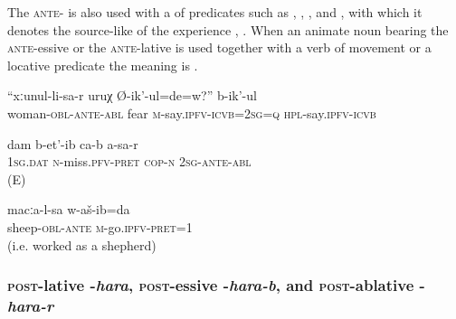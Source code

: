 The \textsc{ante}- is also used with a  of  predicates such as , , , and , with which it denotes the source-like  of the experience , . When an animate noun bearing the \textsc{ante}-essive or the \textsc{ante}-lative is used together with a verb of movement or a locative predicate the meaning is  .
%
\begin{exe}
	\ex	\label{They say, are you afraid of your wife}
	\gll	``xːunul-li-sa-r	uruχ	Ø-ik'-ul=de=w?''	b-ik'-ul \\
		woman-\textsc{obl}-\textsc{ante}-\textsc{abl} fear \textsc{m}-say.\textsc{ipfv}-\textsc{icvb}=2\textsc{sg}=\textsc{q} \textsc{hpl}-say.\textsc{ipfv}-\textsc{icvb}\\
	\glt	{}

	\ex	\label{ex:I miss youMorph}
	\gll	dam b-et'-ib ca-b a-sa-r \\
	\textsc{1sg.dat} \textsc{n}-miss.\textsc{pfv-pret} \textsc{cop-n} \textsc{2sg-ante-abl}	\\
	\glt	{} (E)
	
	\ex	\label{I went after the sheep}
	\gll	macːa-l-sa	w-aš-ib=da\\
		sheep-\textsc{obl}-\textsc{ante}	\textsc{m}-go.\textsc{ipfv}-\textsc{pret}=1\\
	\glt‎‎	 (i.e. worked as a shepherd)
\end{exe}



\subsubsection{\textsc{post}-lative -\textit{hara}, \textsc{post}-essive -\textit{hara-b}, and \textsc{post}-ablative -\textit{hara-r}}
\label{sssec:post-lative -hara, postessive -hara-b, and post-ablative -hara-r}

